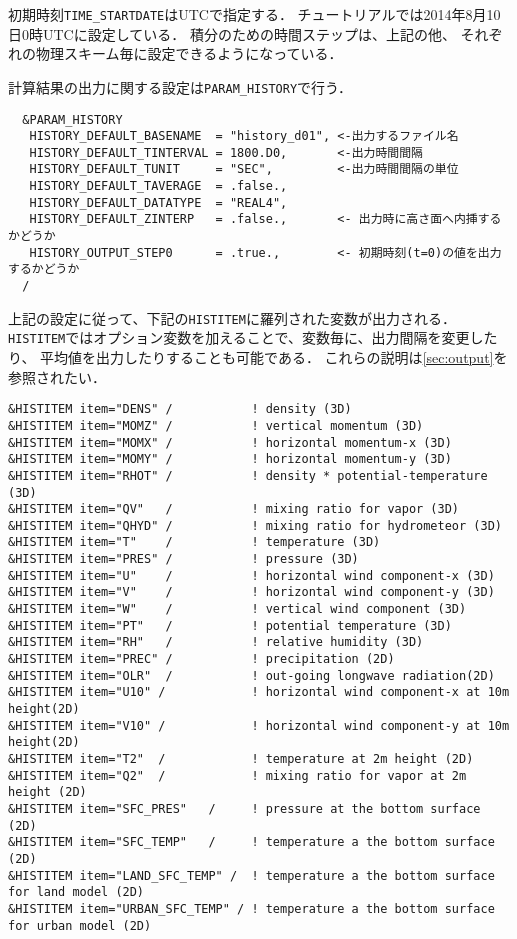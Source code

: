 初期時刻\verb|TIME_STARTDATE|はUTCで指定する．
チュートリアルでは2014年8月10日0時UTCに設定している．
積分のための時間ステップは、上記の他、
それぞれの物理スキーム毎に設定できるようになっている．


計算結果の出力に関する設定は\verb|PARAM_HISTORY|で行う．
\begin{verbatim}
  &PARAM_HISTORY
   HISTORY_DEFAULT_BASENAME  = "history_d01", <-出力するファイル名
   HISTORY_DEFAULT_TINTERVAL = 1800.D0,       <-出力時間間隔
   HISTORY_DEFAULT_TUNIT     = "SEC",         <-出力時間間隔の単位
   HISTORY_DEFAULT_TAVERAGE  = .false.,
   HISTORY_DEFAULT_DATATYPE  = "REAL4",
   HISTORY_DEFAULT_ZINTERP   = .false.,       <- 出力時に高さ面へ内挿するかどうか
   HISTORY_OUTPUT_STEP0      = .true.,        <- 初期時刻(t=0)の値を出力するかどうか
  /
\end{verbatim}
上記の設定に従って、下記の\verb|HISTITEM|に羅列された変数が出力される．
\verb|HISTITEM|ではオプション変数を加えることで、変数毎に、出力間隔を変更したり、
平均値を出力したりすることも可能である．
これらの説明は\ref{sec:output}を参照されたい．

\begin{verbatim}
&HISTITEM item="DENS" /           ! density (3D)
&HISTITEM item="MOMZ" /           ! vertical momentum (3D)
&HISTITEM item="MOMX" /           ! horizontal momentum-x (3D)
&HISTITEM item="MOMY" /           ! horizontal momentum-y (3D)
&HISTITEM item="RHOT" /           ! density * potential-temperature (3D)
&HISTITEM item="QV"   /           ! mixing ratio for vapor (3D)
&HISTITEM item="QHYD" /           ! mixing ratio for hydrometeor (3D)
&HISTITEM item="T"    /           ! temperature (3D)
&HISTITEM item="PRES" /           ! pressure (3D)
&HISTITEM item="U"    /           ! horizontal wind component-x (3D)
&HISTITEM item="V"    /           ! horizontal wind component-y (3D)
&HISTITEM item="W"    /           ! vertical wind component (3D)
&HISTITEM item="PT"   /           ! potential temperature (3D)
&HISTITEM item="RH"   /           ! relative humidity (3D)
&HISTITEM item="PREC" /           ! precipitation (2D)
&HISTITEM item="OLR"  /           ! out-going longwave radiation(2D)
&HISTITEM item="U10" /            ! horizontal wind component-x at 10m height(2D)
&HISTITEM item="V10" /            ! horizontal wind component-y at 10m height(2D)
&HISTITEM item="T2"  /            ! temperature at 2m height (2D)
&HISTITEM item="Q2"  /            ! mixing ratio for vapor at 2m height (2D)
&HISTITEM item="SFC_PRES"   /     ! pressure at the bottom surface (2D)
&HISTITEM item="SFC_TEMP"   /     ! temperature a the bottom surface (2D)
&HISTITEM item="LAND_SFC_TEMP" /  ! temperature a the bottom surface for land model (2D)
&HISTITEM item="URBAN_SFC_TEMP" / ! temperature a the bottom surface for urban model (2D)
\end{verbatim}

